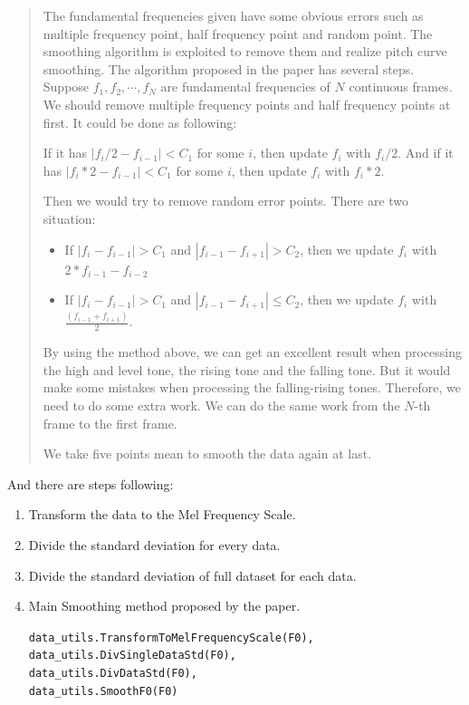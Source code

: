 \documentclass[12pt]{article}
\begin{document}
\begin{itemize}
		\begin{quote}
			The fundamental frequencies given have some obvious errors such as multiple frequency point, half frequency point and random point. The smoothing algorithm is exploited to remove them  and realize pitch curve smoothing. The algorithm proposed in the paper has several steps. Suppose $ f_1, f_2, \cdots, f_N $ are fundamental frequencies of $ N $ continuous frames. We should remove multiple frequency points and half frequency points at first. It could be done as following:

			If it has $ |f_{i} / 2 - f_{i-1}| < C_1 $ for some $ i $, then update $ f_i $ with $ f_i / 2 $. And if it has $ |f_{i} * 2 - f_{i-1}| < C_1 $ for some $ i $, then update $ f_i $ with $ f_i * 2 $.

			Then we would try to remove random error points. There are two situation:
			\begin{itemize}
				\item If $ |f_i - f_{i - 1}| > C_1 $ and $ |f_{i-1} - f_{i + 1} | > C_2 $, then we update $ f_i $ with $ 2 * f_{i - 1} - f_{i - 2} $
				\item If $ |f_i - f_{i - 1}| > C_1 $ and $ |f_{i-1} - f_{i + 1} | \leq C_2 $, then we update $ f_i $ with $ \frac{(f_{i - 1} + f_{i + 1})}{2} $.
			\end{itemize}

			By using the method above, we can get an excellent result when processing the high and level tone, the rising tone and the falling tone. But it would make some mistakes when processing the falling-rising tones. Therefore, we need to do some extra work. We can do the same work from the $ N $-th frame to the first frame.

			We take five points mean to smooth the data again at last.
		\end{quote}
	And there are steps following:
	\begin{enumerate}
		\item Transform the data to the Mel Frequency Scale.
		\item Divide the standard deviation for every data.
		\item Divide the standard deviation of full dataset for each
data.
		\item Main Smoothing method proposed by the paper.

		\texttt{data\_utils.TransformToMelFrequencyScale(F0),\\
		data\_utils.DivSingleDataStd(F0),\\
		data\_utils.DivDataStd(F0),\\
		data\_utils.SmoothF0(F0)}
		

\end{enumerate}
\end{itemize}
\end{document}
